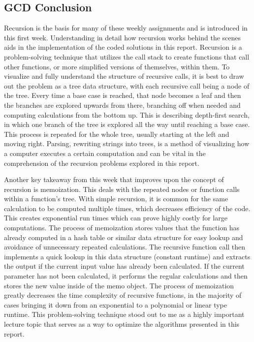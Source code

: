 \documentclass{article}
\theoremstyle{theorem}
\theoremstyle{definition}
\theoremstyle{remark}
\begin{document}
\subsection{GCD Conclusion}

Recursion is the basis for many of these weekly assignments and is introduced in this first week. Understanding in detail how recursion works behind the scenes aids in the implementation of the coded solutions in this report. Recursion is a problem-solving technique that utilizes the call stack to create functions that call other functions, or more simplified versions of themselves, within them. To visualize and fully understand the structure of recursive calls, it is best to draw out the problem as a tree data structure, with each recursive call being a node of the tree. Every time a base case is reached, that node becomes a leaf and then the branches are explored upwards from there, branching off when needed and computing calculations from the bottom up. This is describing depth-first search, in which one branch of the tree is explored all the way until reaching a base case. This process is repeated for the whole tree, usually starting at the left and moving right. Parsing, rewriting strings into trees, is a method of visualizing how a computer executes a certain computation and can be vital in the comprehension of the recursion problems explored in this report. 

Another key takeaway from this week that improves upon the concept of recursion is memoization. This deals with the repeated nodes or function calls within a function's tree. With simple recursion, it is common for the same calculation to be computed multiple times, which decreases efficiency of the code. This creates exponential run times which can prove highly costly for large computations. The process of memoization stores values that the function has already computed in a hash table or similar data structure for easy lookup and avoidance of unnecessary repeated calculations. The recursive function call then implements a quick lookup in this data structure (constant runtime) and extracts the output if the current input value has already been calculated. If the current parameter has not been calculated, it performs the regular calculations and then stores the new value inside of the memo object. The process of memoization greatly decreases the time complexity of recursive functions, in the majority of cases bringing it down from an exponential to a polynomial or linear type runtime. This problem-solving technique stood out to me as a highly important lecture topic that serves as a way to optimize the algorithms presented in this report.
\end{document}
